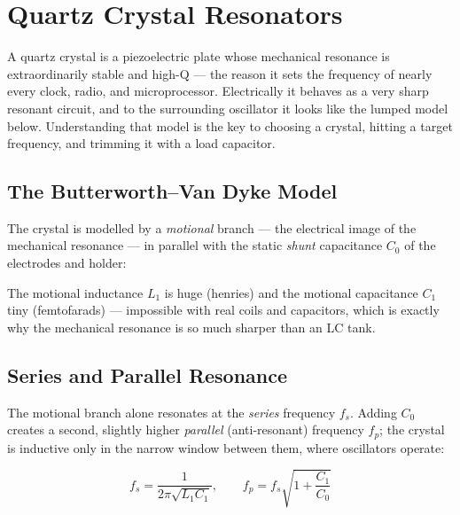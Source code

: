 \section{Quartz Crystal Resonators}\label{sec:wiki_crystals}



A quartz crystal is a piezoelectric plate whose mechanical resonance is extraordinarily stable and high-Q — the reason it sets the frequency of nearly every clock, radio, and microprocessor. Electrically it behaves as a very sharp resonant circuit, and to the surrounding oscillator it looks like the lumped model below. Understanding that model is the key to choosing a crystal, hitting a target frequency, and trimming it with a load capacitor.

      

\subsection{The Butterworth–Van Dyke Model}

      

The crystal is modelled by a \emph{motional} branch — the electrical image of the mechanical resonance — in parallel with the static \emph{shunt} capacitance $C_0$ of the electrodes and holder:


      

The motional inductance $L_1$ is huge (henries) and the motional capacitance $C_1$ tiny (femtofarads) — impossible with real coils and capacitors, which is exactly why the mechanical resonance is so much sharper than an LC tank.

      

\subsection{Series and Parallel Resonance}

      

The motional branch alone resonates at the \emph{series} frequency $f_s$. Adding $C_0$ creates a second, slightly higher \emph{parallel} (anti-resonant) frequency $f_p$; the crystal is inductive only in the narrow window between them, where oscillators operate:

      
\[f_s = \dfrac{1}{2\pi\sqrt{L_1 C_1}},\qquad f_p = f_s\sqrt{1+\dfrac{C_1}{C_0}}\]

